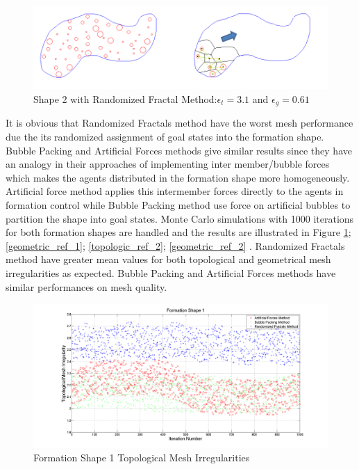 \begin{figure}[H]
\caption{Shape 2 with Randomized Fractal Method:$\epsilon_t = 3.1$ and $\epsilon_g = 0.61$}
\centerline{\includegraphics[scale = 0.65]{Randomized_Fractals_Mesh_2}}
\end{figure} 	

It is obvious that Randomized Fractals method have the worst mesh performance due the its randomized assignment of goal states into the formation shape. Bubble Packing and Artificial Forces methods give similar results since they have an analogy in their approaches of implementing inter member/bubble forces which makes the agents distributed in the formation shape more homogeneously. Artificial force method applies this intermember forces directly to the agents in formation control while Bubble Packing method use force on artificial bubbles to partition the shape into goal states. Monte Carlo simulations with 1000 iterations for both formation shapes are handled and the results are illustrated in Figure \ref{topologic_ref_1}; \ref{geometric_ref_1}; \ref{topologic_ref_2}; \ref{geometric_ref_2} . Randomized Fractals method have greater mean values for both topological and geometrical mesh irregularities as expected.  Bubble Packing and Artificial Forces methods have similar performances on mesh quality.
		
\begin{figure}[H]
\caption{Formation Shape 1 Topological Mesh Irregularities} \label{topologic_ref_1}
\centerline{\includegraphics[scale = 0.35]{Topological_Irr_1}}
\end{figure} 	
		

